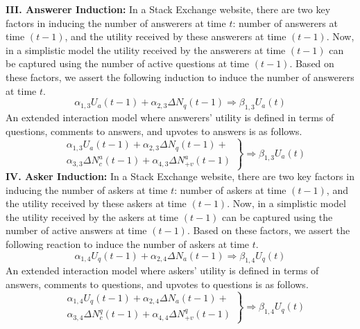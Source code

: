 \iffalse
\indent \textbf{III. Answerer Induction:} In a Stack Exchange website, there are two key factors in inducing the number of answerers at time $t$: number of answerers at time $(t-1)$, and the utility received by these answerers at time $(t-1)$. Now, in a simplistic model the utility received by the answerers at time $(t-1)$ can be captured using the number of active questions at time $(t-1)$. Based on these factors, we assert the following induction to induce the number of answerers at time $t$.
\begin{equation*}
\alpha_{1, 3} U_a(t-1) + \alpha_{2, 3} \Delta N_q(t-1) \Longrightarrow \beta_{1, 3} U_a(t)
\end{equation*} 
\noindent An extended interaction model where answerers' utility is defined in terms of questions, comments to answers, and upvotes to answers is as follows.
\begin{equation*}
\left.
\begin{aligned}
& \alpha_{1, 3} U_a(t-1) + \alpha_{2, 3} \Delta N_q(t-1) +\\
& \alpha_{3, 3} \Delta N_c^a(t-1) + \alpha_{4, 3} \Delta N_{+v}^a(t-1)
\end{aligned}
\right\}
\Longrightarrow \beta_{1, 3} U_a(t)
\end{equation*}
\indent \textbf{IV. Asker Induction:} In a Stack Exchange website, there are two key factors in inducing the number of askers at time $t$: number of askers at time $(t-1)$, and the utility received by these askers at time $(t-1)$. Now, in a simplistic model the utility received by the askers at time $(t-1)$ can be captured using the number of active answers at time $(t-1)$. Based on these factors, we assert the following reaction to induce the number of askers at time $t$. 
\begin{equation*}
\alpha_{1, 4} U_q(t-1) + \alpha_{2, 4} \Delta N_a(t-1) \Longrightarrow \beta_{1, 4} U_q(t)
\end{equation*}
\noindent An extended interaction model where askers' utility is defined in terms of answers, comments to questions, and upvotes to questions is as follows.    
\begin{equation*}
\left.
\begin{aligned}
& \alpha_{1, 4} U_q(t-1) + \alpha_{2, 4} \Delta N_a(t-1) +\\
& \alpha_{3, 4} \Delta N_c^q(t-1) + \alpha_{4, 4} \Delta N_{+v}^q(t-1)
\end{aligned}
\right\}
\Longrightarrow \beta_{1, 4} U_q(t)
\end{equation*}

